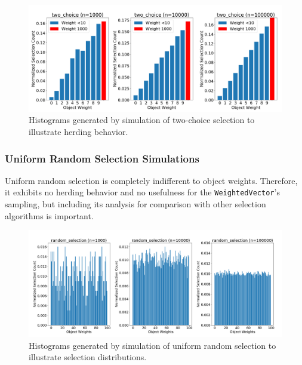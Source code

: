 \documentclass[12pt]{article}
\begin{document}
    \begin{figure}[htbp]
      \centering
      \includegraphics[scale=0.32]{images/pathological_two_choice.png} 
      \caption{Histograms generated by simulation of two-choice selection
               to illustrate herding behavior.}
      \label{fig:pathological_two_choice}
    \end{figure}

    \FloatBarrier

    \subsubsection{Uniform Random Selection Simulations}
    Uniform random selection is completely indifferent to object weights.
    Therefore, it exhibits no herding behavior and no usefulness for the
    \texttt{WeightedVector}'s sampling, but including its analysis for
    comparison with other selection algorithms is important.

    \begin{figure}[htbp]
      \centering
      \includegraphics[scale=0.32]{images/herding_random.png} 
      \caption{Histograms generated by simulation of uniform random selection
               to illustrate selection distributions.}
      \label{fig:herding_random}
    \end{figure}
\end{document}
